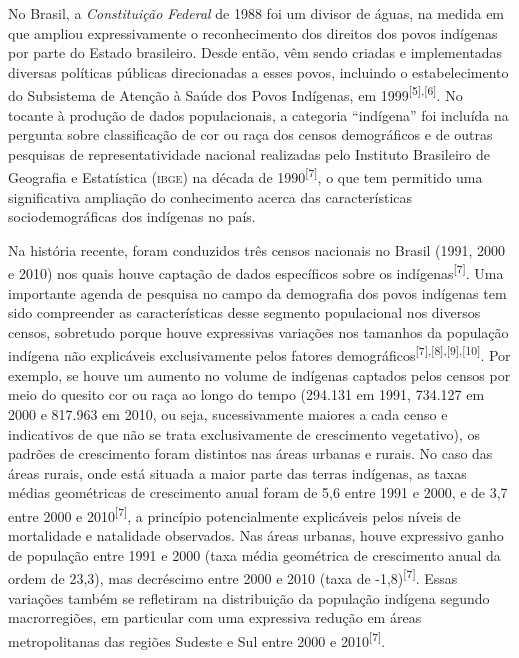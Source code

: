 \documentclass{article}
\begin{document}
No Brasil, a \textit{Constituição Federal}
de 1988 foi um divisor de águas, na medida em que ampliou expressivamente o
reconhecimento dos direitos dos povos indígenas por parte do Estado brasileiro.
Desde então, vêm sendo criadas e implementadas diversas políticas públicas
direcionadas a esses povos, incluindo o estabelecimento do Subsistema de Atenção
à Saúde dos Povos Indígenas, em 1999\textsuperscript{[}\textsuperscript{5}\textsuperscript{]}\textsuperscript{,}\textsuperscript{[}\textsuperscript{6}\textsuperscript{]}. No tocante à produção de dados populacionais, a categoria “indígena” foi
incluída na pergunta sobre classificação de cor ou raça dos censos demográficos
e de outras pesquisas de representatividade nacional realizadas pelo Instituto
Brasileiro de Geografia e Estatística (\textsc{ibge}) na década de 1990\textsuperscript{[}\textsuperscript{7}\textsuperscript{]}, o que tem permitido uma significativa ampliação do conhecimento acerca das
características sociodemográficas dos indígenas no país.

Na história recente, foram conduzidos três censos nacionais no Brasil (1991,
2000 e 2010) nos quais houve captação de dados específicos sobre os indígenas\textsuperscript{[}\textsuperscript{7}\textsuperscript{]}. Uma importante agenda de pesquisa no campo da demografia dos povos indígenas
tem sido compreender as características desse segmento populacional nos diversos
censos, sobretudo porque houve expressivas variações nos tamanhos da população
indígena não explicáveis exclusivamente pelos fatores demográficos\textsuperscript{[}\textsuperscript{7}\textsuperscript{]}\textsuperscript{,}\textsuperscript{[}\textsuperscript{8}\textsuperscript{]}\textsuperscript{,}\textsuperscript{[}\textsuperscript{9}\textsuperscript{]}\textsuperscript{,}\textsuperscript{[}\textsuperscript{10}\textsuperscript{]}. Por exemplo, se houve um aumento no volume de indígenas captados pelos censos
por meio do quesito cor ou raça ao longo do tempo (294.131 em 1991, 734.127 em
2000 e 817.963 em 2010, ou seja, sucessivamente maiores a cada censo e
indicativos de que não se trata exclusivamente de crescimento vegetativo), os
padrões de crescimento foram distintos nas áreas urbanas e rurais. No caso das
áreas rurais, onde está situada a maior parte das terras indígenas, as taxas
médias geométricas de crescimento anual foram de 5,6 entre 1991 e 2000, e de 3,7
entre 2000 e 2010\textsuperscript{[}\textsuperscript{7}\textsuperscript{]}, a princípio potencialmente explicáveis pelos níveis de mortalidade e
natalidade observados. Nas áreas urbanas, houve expressivo ganho de população
entre 1991 e 2000 (taxa média geométrica de crescimento anual da ordem de 23,3),
mas decréscimo entre 2000 e 2010 (taxa de -1,8)\textsuperscript{[}\textsuperscript{7}\textsuperscript{]}. Essas variações também se refletiram na distribuição da população indígena
segundo macrorregiões, em particular com uma expressiva redução em áreas
metropolitanas das regiões Sudeste e Sul entre 2000 e 2010\textsuperscript{[}\textsuperscript{7}\textsuperscript{]}.
\end{document}

